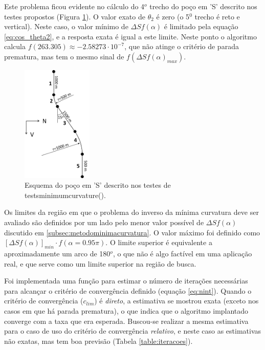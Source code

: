\documentclass[final,5p]{elsarticle}
\numberwithin{equation}{section}
\begin{document}
    Este problema ficou evidente no cálculo do 4$^o$ trecho do poço em 'S' descrito nos testes propostos (Figura \ref{fig:pocoS}). O valor exato de $\theta_2$ é zero (o 5$^0$ trecho é reto e vertical). Neste caso, o valor mínimo de $\Delta S f(\alpha)$ é limitado pela equação \ref{eq:cos_theta2}, e a resposta exata é igual a este limite. Neste ponto o algoritmo calcula $f(263.305) \approx -2.58273 \cdot 10^{-7}$, que não atinge o critério de parada prematura, mas tem o mesmo sinal de $f(\Delta S f(\alpha)_{max})$.

    \begin{figure}[hbt!]
        \label{fig:pocoS}
        \centering
        \includegraphics[width=0.3\textwidth]{EsquemaPoco}
        \caption{Esquema do poço em 'S' descrito nos testes de tests\textunderscore minimum\textunderscore curvature().}
    \end{figure}

    Os limites da região em que o problema do inverso da mínima curvatura deve ser avaliado são definidos por um lado pelo menor valor possível de $\Delta S f(\alpha)$ discutido em \ref{subsec:metodominimacurvatura}. O valor máximo foi definido como $[\Delta S f(\alpha)]_{min} \cdot f(\alpha = 0.95\pi)$. O limite superior é equivalente a aproximadamente um arco de 180$^o$, o que não é algo factível em uma aplicação real, e que serve como um limite superior na região de busca.

    Foi implementada uma função para estimar o número de iterações necessárias para alcançar o critério de convergência definido (equação \ref{eq:nint}). Quando o critério de convergência ($c_{lim}$) é \emph{direto}, a estimativa se mostrou exata (exceto nos casos em que há parada prematura), o que indica que o algoritmo implantado converge com a taxa que era esperada. Buscou-se realizar a mesma estimativa para o caso de uso do critério de convergência \emph{relativo}, e neste caso as estimativas não exatas, mas tem boa previsão (Tabela \ref{table:iteracoes}).
    
\end{document}
